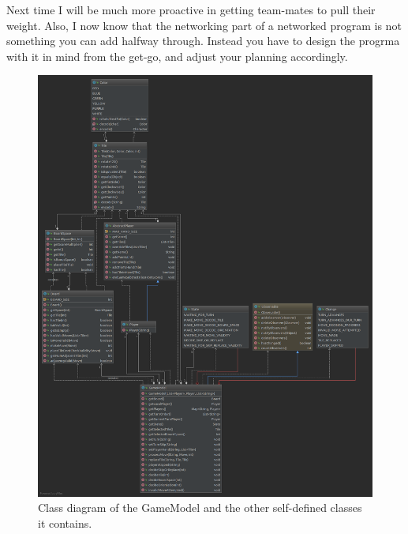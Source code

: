 \documentclass[12pt, letterpaper]{article}
\begin{document}
    Next time I will be much more proactive in getting team-mates to pull their weight.
    Also, I now know that the networking part of a networked program is not something you can add halfway through.
    Instead you have to design the progrma with it in mind from the get-go, and adjust your planning accordingly.

    \begin{figure}[t]
        \begin{center}
            \includegraphics[width=\textwidth]{GameModel.png}
            \caption{Class diagram of the GameModel and the other self-defined classes it contains.}
            \label{fig:modelDiagram}
        \end{center}
    \end{figure}
\end{document}
